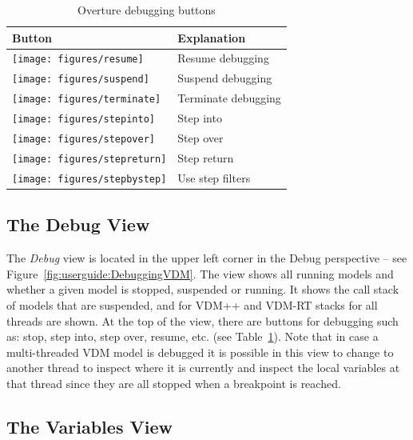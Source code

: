 \documentclass{overturerepchap}
\begin{document}
\begin{table}
\begin{center}
\caption{Overture debugging buttons\label{tab:debugButtons}}
\begin{tabular}{|l|l|}\hline \hline
\textbf{Button} & \textbf{Explanation} \\ \hline
\texttt{[image: figures/resume]} & Resume
debugging\index{icon!resume debugging} \\
\texttt{[image: figures/suspend]} & Suspend
debugging\index{icon!suspend debugging}\\
\texttt{[image: figures/terminate]} & Terminate
debugging\index{icon!terminate debugging}\\
\texttt{[image: figures/stepinto]} & Step
into\index{icon!step into}\\
\texttt{[image: figures/stepover]} & Step
over\index{icon!step over} \\
\texttt{[image: figures/stepreturn]} & Step
return\index{icon!step return}\\
\texttt{[image: figures/stepbystep]} & Use step
filters\index{icon!use step filters}\\
\hline \hline
\end{tabular}
\end{center}
\end{table}

\subsection{The Debug View}

The \emph{Debug} view is located in the upper left corner in the Debug perspective --
see Figure~\ref{fig:userguide:DebuggingVDM}. The view shows all running
models and whether a given model is stopped, suspended or running.
It shows the call stack of models that are suspended, and for VDM++ and VDM-RT stacks
for all threads are shown.
At the top of the view, there are buttons
for debugging such as: stop, step into, step over, resume, etc. (see
Table~\ref{tab:debugButtons}). Note that in case a multi-threaded VDM
model is debugged it is possible in this view to change to another
thread to inspect where it is currently and inspect the local
variables at that thread since they are all stopped when a breakpoint
is reached.

\subsection{The Variables View}
\end{document}
